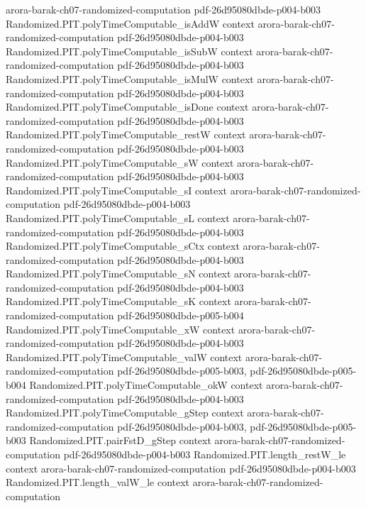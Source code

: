 \begin{theorem}
  {arora-barak-ch07-randomized-computation}
  {pdf-26d95080dbde-p004-b003}
\proofstep
  {Randomized.PIT.polyTimeComputable_isAddW}
  {context}
  {arora-barak-ch07-randomized-computation}
  {pdf-26d95080dbde-p004-b003}
\proofstep
  {Randomized.PIT.polyTimeComputable_isSubW}
  {context}
  {arora-barak-ch07-randomized-computation}
  {pdf-26d95080dbde-p004-b003}
\proofstep
  {Randomized.PIT.polyTimeComputable_isMulW}
  {context}
  {arora-barak-ch07-randomized-computation}
  {pdf-26d95080dbde-p004-b003}
\proofstep
  {Randomized.PIT.polyTimeComputable_isDone}
  {context}
  {arora-barak-ch07-randomized-computation}
  {pdf-26d95080dbde-p004-b003}
\proofstep
  {Randomized.PIT.polyTimeComputable_restW}
  {context}
  {arora-barak-ch07-randomized-computation}
  {pdf-26d95080dbde-p004-b003}
\proofstep
  {Randomized.PIT.polyTimeComputable_sW}
  {context}
  {arora-barak-ch07-randomized-computation}
  {pdf-26d95080dbde-p004-b003}
\proofstep
  {Randomized.PIT.polyTimeComputable_sI}
  {context}
  {arora-barak-ch07-randomized-computation}
  {pdf-26d95080dbde-p004-b003}
\proofstep
  {Randomized.PIT.polyTimeComputable_sL}
  {context}
  {arora-barak-ch07-randomized-computation}
  {pdf-26d95080dbde-p004-b003}
\proofstep
  {Randomized.PIT.polyTimeComputable_sCtx}
  {context}
  {arora-barak-ch07-randomized-computation}
  {pdf-26d95080dbde-p004-b003}
\proofstep
  {Randomized.PIT.polyTimeComputable_sN}
  {context}
  {arora-barak-ch07-randomized-computation}
  {pdf-26d95080dbde-p004-b003}
\proofstep
  {Randomized.PIT.polyTimeComputable_sK}
  {context}
  {arora-barak-ch07-randomized-computation}
  {pdf-26d95080dbde-p005-b004}
\proofstep
  {Randomized.PIT.polyTimeComputable_xW}
  {context}
  {arora-barak-ch07-randomized-computation}
  {pdf-26d95080dbde-p004-b003}
\proofstep
  {Randomized.PIT.polyTimeComputable_valW}
  {context}
  {arora-barak-ch07-randomized-computation}
  {pdf-26d95080dbde-p005-b003,
    pdf-26d95080dbde-p005-b004}
\proofstep
  {Randomized.PIT.polyTimeComputable_okW}
  {context}
  {arora-barak-ch07-randomized-computation}
  {pdf-26d95080dbde-p004-b003}
\proofstep
  {Randomized.PIT.polyTimeComputable_gStep}
  {context}
  {arora-barak-ch07-randomized-computation}
  {pdf-26d95080dbde-p004-b003,
    pdf-26d95080dbde-p005-b003}
\proofstep
  {Randomized.PIT.pairFstD_gStep}
  {context}
  {arora-barak-ch07-randomized-computation}
  {pdf-26d95080dbde-p004-b003}
\proofstep
  {Randomized.PIT.length_restW_le}
  {context}
  {arora-barak-ch07-randomized-computation}
  {pdf-26d95080dbde-p004-b003}
\proofstep
  {Randomized.PIT.length_valW_le}
  {context}
  {arora-barak-ch07-randomized-computation}

\end{theorem}
